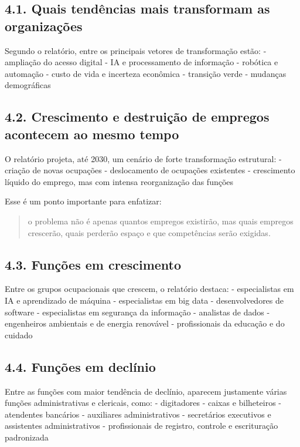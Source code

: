 \documentclass[
]{book}
\theoremstyle{definition}
\theoremstyle{definition}
\theoremstyle{definition}
\theoremstyle{definition}
\theoremstyle{remark}
\begin{document}
\subsection{4.1. Quais tendências mais transformam as organizações}\label{quais-tenduxeancias-mais-transformam-as-organizauxe7uxf5es}

Segundo o relatório, entre os principais vetores de transformação estão:
- ampliação do acesso digital
- IA e processamento de informação
- robótica e automação
- custo de vida e incerteza econômica
- transição verde
- mudanças demográficas

\subsection{4.2. Crescimento e destruição de empregos acontecem ao mesmo tempo}\label{crescimento-e-destruiuxe7uxe3o-de-empregos-acontecem-ao-mesmo-tempo}

O relatório projeta, até 2030, um cenário de forte transformação estrutural:
- criação de novas ocupações
- deslocamento de ocupações existentes
- crescimento líquido do emprego, mas com intensa reorganização das funções

Esse é um ponto importante para enfatizar:

\begin{quote}
o problema não é apenas quantos empregos existirão, mas quais empregos crescerão, quais perderão espaço e que competências serão exigidas.
\end{quote}

\subsection{4.3. Funções em crescimento}\label{funuxe7uxf5es-em-crescimento}

Entre os grupos ocupacionais que crescem, o relatório destaca:
- especialistas em IA e aprendizado de máquina
- especialistas em big data
- desenvolvedores de software
- especialistas em segurança da informação
- analistas de dados
- engenheiros ambientais e de energia renovável
- profissionais da educação e do cuidado

\subsection{4.4. Funções em declínio}\label{funuxe7uxf5es-em-decluxednio}

Entre as funções com maior tendência de declínio, aparecem justamente várias funções administrativas e clericais, como:
- digitadores
- caixas e bilheteiros
- atendentes bancários
- auxiliares administrativos
- secretários executivos e assistentes administrativos
- profissionais de registro, controle e escrituração padronizada
\end{document}
